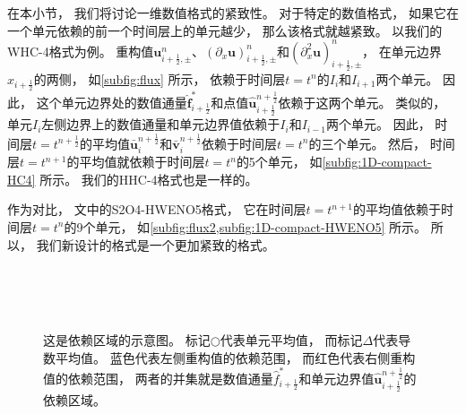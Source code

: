 在本小节，
我们将讨论一维数值格式的紧致性。
对于特定的数值格式，
如果它在一个单元依赖的前一个时间层上的单元越少，
那么该格式就越紧致。
以我们的WHC-4格式为例。
重构值${\bm{u}}_{i+\frac{1}{2},\pm}^{n}$、$({\partial_{x}}{\bm{u}})_{i+\frac{1}{2},\pm}^{n}$和$({\partial_{x}^2}{\bm{u}})_{i+\frac{1}{2},\pm}^{n}$，
在单元边界$x_{i+\frac{1}{2}}$的两侧，
如\cref{subfig:flux} 所示，
依赖于时间层$t=t^n$的$I_i$和$I_{i+1}$两个单元。
因此，
这个单元边界处的数值通量$\hat{\bm{f}}_{i+\frac{1}{2}}^*$和点值$\hat{\bm{u}}_{i+\frac{1}{2}}^{n+\frac{1}{2}}$依赖于这两个单元。
类似的，
单元$I_{i}$左侧边界上的数值通量和单元边界值依赖于$I_i$和$I_{i-1}$两个单元。
因此，
时间层$t=t^{n+\frac{1}{2}}$的平均值$\bar{\bm{u}}_{i}^{n+\frac{1}{2}}$和$\bar{\bm{v}}_{i}^{n+\frac{1}{2}}$依赖于时间层$t=t^n$的三个单元。
然后，
时间层$t=t^{n+1}$的平均值就依赖于时间层$t=t^n$的5个单元，
如\cref{subfig:1D-compact-HC4} 所示。
我们的HHC-4格式也是一样的。

作为对比，
文\cite{du2018hermite}中的S2O4-HWENO5格式，
它在时间层$t=t^{n+1}$的平均值依赖于时间层$t=t^n$的9个单元，
如\cref{subfig:flux2,subfig:1D-compact-HWENO5} 所示。
所以，
我们新设计的格式是一个更加紧致的格式。

\begin{figure}[htbp]
  \centering
   \\
   \\
   \\
  \caption{这是依赖区域的示意图。
    标记${\bigcirc}$代表单元平均值，
    而标记${\Delta}$代表导数平均值。
    蓝色代表左侧重构值的依赖范围，
    而红色代表右侧重构值的依赖范围，
    两者的并集就是数值通量$\hat f^*_{i+\frac{1}{2}}$和单元边界值$\hat{\bm{u}}_{i+\frac{1}{2}}^{n+\frac{1}{2}}$的依赖区域。
  }
  \label{fig:1D-compactness}
\end{figure}

